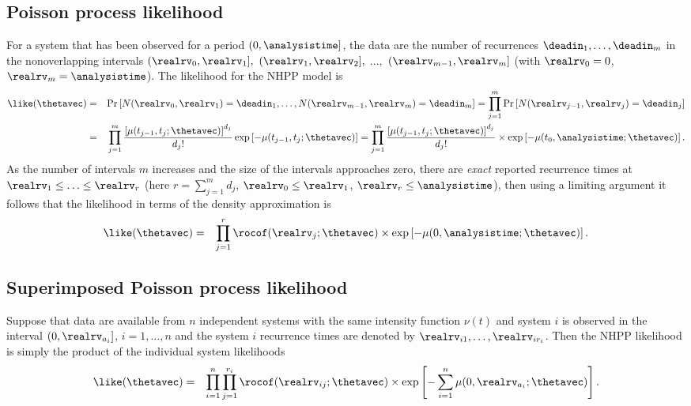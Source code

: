 \subsection{Poisson process likelihood}
For a system that has been observed for a period $(0,
\analysistime]$, the data are the number of recurrences
$\deadin_{1}, \ldots, \deadin_{m}$ in the nonoverlapping intervals
$(\realrv_{0}, \realrv_{1}],$ $ (\realrv_{1}, \realrv_{2}],$ $
\ldots,$ $ (\realrv_{m-1},
\realrv_{m}]$ (with $\realrv_{0}=0$, $\realrv_{m}=\analysistime$). The
likelihood for the NHPP model is
\begin{eqnarray*}
\like(\thetavec)&=& \Pr \left [N(\realrv_{0},\realrv_{1})=\deadin_{1}, \ldots,
N(\realrv_{m-1},\realrv_{m})=\deadin_{m} \right ]
=\prod_{j=1}^{m} \Pr \left [N(\realrv_{j-1},\realrv_{j})=\deadin_{j} \right ]
\\
&=&\prod_{j=1}^{m} 
\frac{\left [ \mu(t_{j-1}, t_{j};\thetavec) 
       \right]^{d_{j}}}
                  {d_{j}!}
	     \exp \left [-
	\mu(t_{j-1}, t_{j};\thetavec)
		  \right ]
=
\prod_{j=1}^{m} \frac{
\left [ \mu(t_{j-1},t_{j};\thetavec) \right ]^{d_{j}}}
                  {d_{j}!} \times
\exp \left [-
\mu(t_{0}, \analysistime;\thetavec) 
		  \right ].
\end{eqnarray*}
As the number of intervals $m$ increases and the size of the
intervals approaches zero, there are
{\em exact} reported recurrence times at 
$\realrv_{1} \le \ldots \le
\realrv_{r}$ (here $r=\sum_{j=1}^{m}d_{j}$, 
$\realrv_{0} \le \realrv_{1}$, $\realrv_{r} \le \analysistime$), then
using a limiting argument it follows that the likelihood in terms of
the density approximation is
\begin{eqnarray*}
\like(\thetavec)&=& 
\prod_{j=1}^{r} \rocof(\realrv_{j};\thetavec)
\times
\exp \left [-
\mu(0, \analysistime;\thetavec) 
		  \right ].
\end{eqnarray*}

\subsection{Superimposed Poisson process likelihood}
Suppose that data are
available from $n$ independent systems with the same intensity
function $\nu(t)$ and system $i$ is observed in the interval $(0,
\realrv_{a_{i}}]$, $i=1, \ldots, n$ and the system $i$ recurrence times are
denoted by $\realrv_{i1}, \ldots, \realrv_{ir_{i}}$.  Then the NHPP
likelihood is simply the product of the individual system likelihoods
\begin{eqnarray*}
\like(\thetavec)&=& 
\prod_{i=1}^{n}\prod_{j=1}^{r_{i}} 
\rocof(\realrv_{ij};\thetavec)
\times
\exp \left [- \sum_{i=1}^{n}
\mu(0, \realrv_{a_{i}};\thetavec) 
		  \right ].
\end{eqnarray*}

